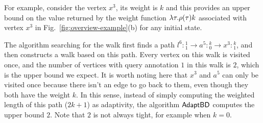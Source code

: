 For example, consider the vertex $x^{3}$, its weight is $k$ and this provides an upper bound on the value returned by the weight function $\lambda \mathtt{\tau}. \rho(\mathtt{\tau})k$ associated with vertex $x^{3}$ in Fig.~\ref{fig:overview-example}(b) for any initial state. 

The algorithm searching for the walk first finds a path $l^6:{}^1_1 \to a^5: {}^k_0 \to x^3: {}^k_1$, and then constructs a walk based on this path. Every vertex on this walk is visited once, and the number of vertices with query annotation $1$ in this walk is $2$, which is the upper bound we expect.
{It is worth noting here that $x^3$ and $a^5$ can only be visited once because there isn't an edge to go back to them, even though they both have the weight $k$}.
In this sense, instead of simply computing the weighted length of this path ($2k+1$) as adaptivity, the algorithm $\mathsf{AdaptBD}$ computes the upper bound $2$. Note that $2$ is not always tight, for example when $k = 0$.
